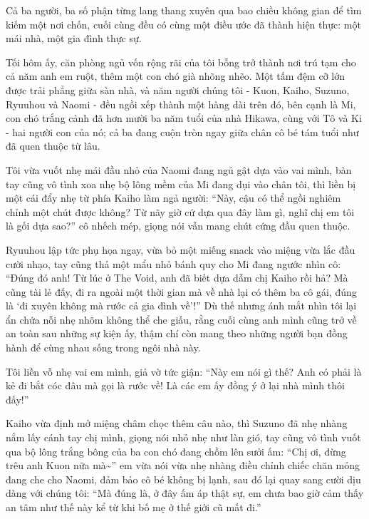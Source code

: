 ﻿\documentclass[../main.tex]{subfiles}
\begin{document}
Cả ba người, ba số phận từng lang thang xuyên qua bao chiều không gian để tìm kiếm một nơi chốn, cuối cùng đều có cùng một điều ước đã thành hiện thực: một mái nhà, một gia đình thực sự.

\ct


Tối hôm ấy, căn phòng ngủ vốn rộng rãi của tôi bỗng trở thành nơi trú tạm cho cả năm anh em ruột, thêm một con chó già nhõng nhẽo. Một tấm đệm cỡ lớn được trải phẳng giữa sàn nhà, và năm người chúng tôi - Kuon, Kaiho, Suzuno, Ryuuhou và Naomi - đều ngồi xếp thành một hàng dài trên đó, bên cạnh là Mi, con chó trắng cảnh đã hơn mười ba năm tuổi của nhà Hikawa, cùng với Tô và Ki - hai người con của nó; cả ba đang cuộn tròn ngay giữa chân cô bé tám tuổi như đã quen thuộc từ lâu.

Tôi vừa vuốt nhẹ mái đầu nhỏ của Naomi đang ngủ gật dựa vào vai mình, bàn tay cũng vô tình xoa nhẹ bộ lông mềm của Mi đang dụi vào chân tôi, thì liền bị một cái đẩy nhẹ từ phía Kaiho làm ngả người: ``Này, cậu có thể ngồi nghiêm chỉnh một chút được không? Từ nãy giờ cứ dựa qua đây làm gì, nghĩ chị em tôi là gối dựa sao?'' cô nhếch mép, giọng nói vẫn mang chút cứng đầu quen thuộc.

Ryuuhou lập tức phụ họa ngay, vừa bỏ một miếng snack vào miệng vừa lắc đầu cười nhạo, tay cũng thả một mẩu nhỏ bánh quy cho Mi đang ngước nhìn cô: ``Đúng đó anh! Từ lúc ở The Void, anh đã biết dựa dẫm chị Kaiho rồi hả? Mà cũng tài lẻ đấy, đi ra ngoài một thời gian mà về nhà lại có thêm ba cô gái, đúng là `đi xuyên không mà rước cả gia đình về'!'' Dù thế nhưng ánh mắt nhìn tôi lại ẩn chứa nỗi nhẹ nhõm không thể che giấu, rằng cuối cùng anh mình cũng trở về an toàn sau những sự kiện ấy, thậm chí còn mang theo những người bạn đồng hành để cùng nhau sống trong ngôi nhà này.

Tôi liền vỗ nhẹ vai em mình, giả vờ tức giận: ``Này em nói gì thế? Anh có phải là kẻ đi bắt cóc đâu mà gọi là rước về! Là các em ấy đồng ý ở lại nhà mình thôi đấy!''

Kaiho vừa định mở miệng châm chọc thêm câu nào, thì Suzuno đã nhẹ nhàng nắm lấy cánh tay chị mình, giọng nói nhỏ nhẹ như làn gió, tay cũng vô tình vuốt qua bộ lông trắng bông của ba con chó đang chồm lên sưởi ấm: ``Chị ơi, đừng trêu anh Kuon nữa mà\~{}'' em vừa nói vừa nhẹ nhàng điều chỉnh chiếc chăn mỏng đang che cho Naomi, đảm bảo cô bé không bị lạnh, sau đó lại quay sang cười dịu dàng với chúng tôi: ``Mà đúng là, ở đây ấm áp thật sự, em chưa bao giờ cảm thấy an tâm như thế này kể từ khi bố mẹ ở thế giới cũ mất đi.''
\end{document}
